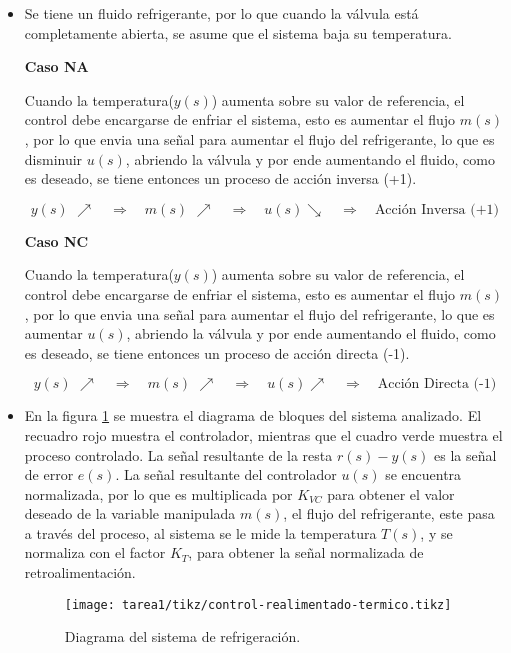 \begin{ejercicio}
  \begin{itemize}
    \item 
    Se tiene un fluido refrigerante, por lo que cuando la válvula está completamente abierta, se asume que el sistema baja su temperatura.\\\par

    \textbf{Caso NA}\par
    Cuando la temperatura($y(s)$) aumenta sobre su valor de referencia, el control debe encargarse de enfriar el sistema, esto es aumentar el flujo $m(s)$, por lo que envia una señal para aumentar el flujo del refrigerante, lo que es disminuir $u(s)$, abriendo la válvula y por ende aumentando el fluido, como es deseado, se tiene entonces un proceso de acción inversa (+1).

    \begin{equation*}
      y(s) \mspace{6mu} \nearrow  \quad \Rightarrow \quad  m(s) \mspace{6mu} \nearrow  \quad \Rightarrow \quad  u(s) \searrow \quad \Rightarrow \quad \text{Acción Inversa (+1)}
    \end{equation*}

    \textbf{Caso NC}\par
    Cuando la temperatura($y(s)$) aumenta sobre su valor de referencia, el control debe encargarse de enfriar el sistema, esto es aumentar el flujo $m(s)$, por lo que envia una señal para aumentar el flujo del refrigerante, lo que es aumentar $u(s)$, abriendo la válvula y por ende aumentando el fluido, como es deseado, se tiene entonces un proceso de acción directa (-1).

    \begin{equation*}
      y(s) \mspace{6mu} \nearrow  \quad \Rightarrow \quad  m(s) \mspace{6mu} \nearrow  \quad \Rightarrow \quad  u(s) \nearrow \quad \Rightarrow \quad \text{Acción Directa (-1)}
    \end{equation*}

  \item
  En la figura \ref{ej3:diag1} se muestra el diagrama de bloques del sistema analizado. El recuadro rojo muestra el controlador, mientras que el cuadro verde muestra el proceso controlado. La señal resultante de la resta $r(s) - y(s)$ es la señal de error $e(s)$. La señal resultante del controlador $u(s)$ se encuentra normalizada, por lo que es multiplicada por $K_{VC}$ para obtener el valor deseado de la variable manipulada $m(s)$, el flujo del refrigerante, este pasa a través del proceso, al sistema se le mide la temperatura $T(s)$, y se normaliza con el factor $K_T$, para obtener la señal normalizada de retroalimentación.
  \begin{figure}[H]
      \centering
      \texttt{[image: tarea1/tikz/control-realimentado-termico.tikz]}
      \caption{Diagrama del sistema de refrigeración.}
      \label{ej3:diag1}
    \end{figure}
  \end{itemize}
\end{ejercicio}